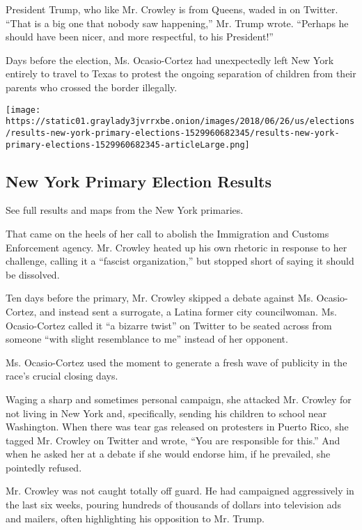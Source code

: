 President Trump, who like Mr. Crowley is from Queens, waded in on
Twitter. ``That is a big one that nobody saw happening,'' Mr. Trump
wrote. ``Perhaps he should have been nicer, and more respectful, to his
President!''

Days before the election, Ms. Ocasio-Cortez had unexpectedly left New
York entirely to travel to Texas to protest the ongoing separation of
children from their parents who crossed the border illegally.

\href{https://www.nytimes3xbfgragh.onion/interactive/2018/06/26/us/elections/results-new-york-primary-elections.html}{}

\texttt{[image: https://static01.graylady3jvrrxbe.onion/images/2018/06/26/us/elections/results-new-york-primary-elections-1529960682345/results-new-york-primary-elections-1529960682345-articleLarge.png]}

\hypertarget{new-york-primary-election-results}{%
\subsection{New York Primary Election
Results}\label{new-york-primary-election-results}}

See full results and maps from the New York primaries.

That came on the heels of her call to abolish the Immigration and
Customs Enforcement agency. Mr. Crowley heated up his own rhetoric in
response to her challenge, calling it a ``fascist organization,'' but
stopped short of saying it should be dissolved.

Ten days before the primary, Mr. Crowley skipped a debate against Ms.
Ocasio-Cortez, and instead sent a surrogate, a Latina former city
councilwoman. Ms. Ocasio-Cortez called it ``a bizarre twist'' on Twitter
to be seated across from someone ``with slight resemblance to me''
instead of her opponent.

Ms. Ocasio-Cortez used the moment to generate a fresh wave of publicity
in the race's crucial closing days.

Waging a sharp and sometimes personal campaign, she attacked Mr. Crowley
for not living in New York and, specifically, sending his children to
school near Washington. When there was tear gas released on protesters
in Puerto Rico, she tagged Mr. Crowley on Twitter and wrote, ``You are
responsible for this.'' And when he asked her at a debate if she would
endorse him, if he prevailed, she pointedly refused.

Mr. Crowley was not caught totally off guard. He had campaigned
aggressively in the last six weeks, pouring hundreds of thousands of
dollars into television ads and mailers, often highlighting his
opposition to Mr. Trump.

